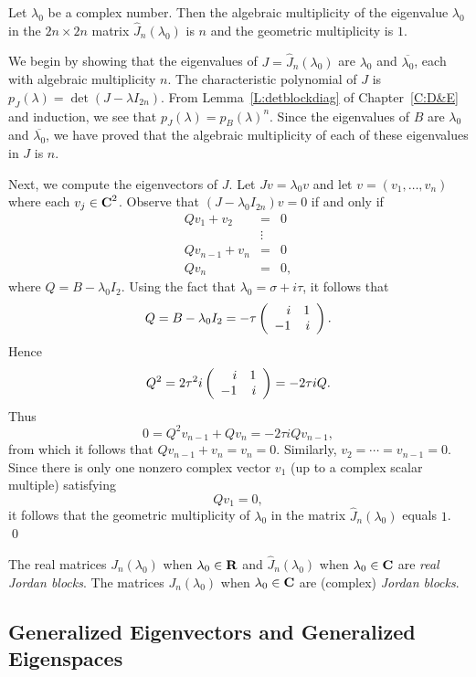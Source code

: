 \begin{lemma}
Let $\lambda_0$ be a complex number.  Then the algebraic multiplicity
of the eigenvalue $\lambda_0$ in the $2n\times 2n$ matrix
$\widehat{J}_n(\lambda_0)$ is $n$ and the geometric multiplicity is $1$.
\end{lemma}

\proof We begin by showing that the eigenvalues of
$J=\widehat{J}_n(\lambda_0)$ are $\lambda_0$ and $\overline{\lambda_0}$, each 
with algebraic multiplicity $n$.  The characteristic polynomial of $J$ is 
$p_J(\lambda)=\det(J-\lambda I_{2n})$.  From Lemma~\ref{L:detblockdiag} of 
Chapter~\ref{C:D&E} and induction, we see that $p_J(\lambda)=p_B(\lambda)^n$. 
Since the eigenvalues of $B$ are $\lambda_0$ and $\overline{\lambda_0}$, we
have proved that the algebraic multiplicity of each of these eigenvalues in 
$J$ is $n$.
   
Next, we compute the eigenvectors of $J$.  Let $Jv=\lambda_0v$ 
and let $v=(v_1,\ldots,v_n)$ where each $v_j\in\mbox{$\bf{C}$}^2$.  Observe that 
$(J-\lambda_0I_{2n})v=0$ if and only if
\begin{eqnarray*}
Qv_1 + v_2 & = & 0 \\
& \vdots & \\
Qv_{n-1} + v_n & = & 0 \\
Qv_n & = & 0,
\end{eqnarray*}
where $Q=B-\lambda_0I_2$.
Using the fact that $\lambda_0=\sigma+i\tau$, it follows that 
\[
Q=B-\lambda_0I_2 = -\tau\left(\begin{array}{rr} i & 1\\ -1 &i\end{array}\right).
\]
Hence
\[
Q^2 = 2\tau^2i\left(\begin{array}{rr} i & 1\\ -1 &i\end{array}\right)=-2\tau iQ.
\]
Thus
\[
0 = Q^2v_{n-1} + Qv_n
= -2\tau iQv_{n-1},
\]
from which it follows that $Qv_{n-1}+v_n = v_n = 0$.  Similarly, 
$v_2=\cdots=v_{n-1}=0$.  Since there is only one nonzero complex vector 
$v_1$ (up to a complex scalar multiple) satisfying
\[
Qv_1 = 0,
\]
it follows that the geometric multiplicity of $\lambda_0$ in the matrix
$\widehat{J}_n(\lambda_0)$ equals $1$.  \qed

\begin{Def}  \label{D:jordanblock}
The real matrices $J_n(\lambda_0)$ when $\lambda_0\in\mbox{$\bf{R}$}$ and 
$\widehat{J}_n(\lambda_0)$ when $\lambda_0\in\mbox{$\bf{C}$}$ are {\em real Jordan
blocks\/}.  The matrices $J_n(\lambda_0)$ when $\lambda_0\in\mbox{$\bf{C}$}$ are (complex)
{\em Jordan blocks\/}.
\end{Def} 

\subsection*{Generalized Eigenvectors and Generalized Eigenspaces}

